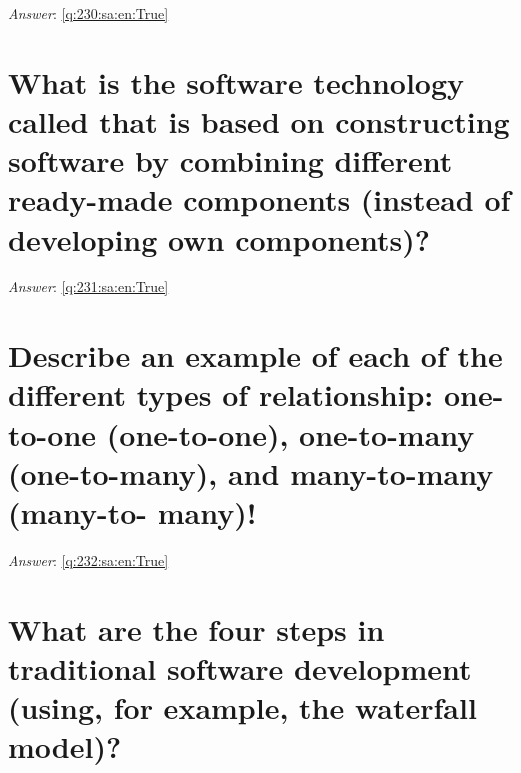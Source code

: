 \documentclass[a4paper,11pt,oneside]{book}
\begin{document}
\begin{sloppypar}
\label{q:230:sa:en:False}

\vspace{2cm}

\noindent\makebox[\textwidth]{\hrulefill}

\vspace{1cm}

\textit{Answer}: \autoref{q:230:sa:en:True}



\section{What is the software technology called that is based on constructing software by combining different ready-made components (instead of developing own components)?}

\label{q:231:sa:en:False}

\vspace{2cm}

\noindent\makebox[\textwidth]{\hrulefill}

\vspace{1cm}

\textit{Answer}: \autoref{q:231:sa:en:True}



\section{Describe an example of each of the different types of relationship: one-to-one (one-to-one), one-to-many (one-to-many), and many-to-many (many-to- many)!}

\label{q:232:sa:en:False}

\vspace{2cm}

\noindent\makebox[\textwidth]{\hrulefill}

\vspace{1cm}

\textit{Answer}: \autoref{q:232:sa:en:True}



\section{What are the four steps in traditional software development (using, for example, the waterfall model)?}

\label{q:233:sa:en:False}

\vspace{2cm}


\end{sloppypar}
\end{document}
